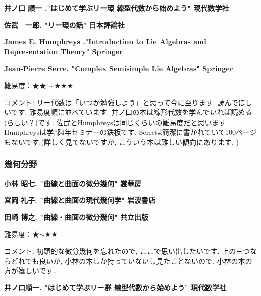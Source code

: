 \textbf{井ノ口 順一 ."はじめて学ぶリー環 線型代数から始めよう" 現代数学社} \vspace{-6pt} 

\textbf{佐武　一郎. "リー環の話" 日本評論社} \vspace{-6pt} 

\textbf{James E. Humphreys ."Introduction to Lie Algebras and Representation Theory" Springer} \vspace{-6pt} 

\textbf{Jean-Pierre Serre. "Complex Semisimple Lie Algebras" Springer}  　\vspace{-6pt} 

難易度：★★ $\sim$★★★\vspace{-6pt} 

コメント: リー代数は「いつか勉強しよう」と思って今に至ります. 読んでほしいです. 
難易度順に並べています. 井ノ口の本は線形代数を学んでいれば読める(らしい？)です. 佐武とHumphreysは同じくらいの難易度だと思います. Humphreysは学部4年セミナーの鉄板です. Serreは簡潔に書かれていて100ページもないです.(詳しく見てないですが, こういう本は難しい傾向にあります. ) 
\vspace{8pt}





\subsubsection{幾何分野}


\textbf{小林 昭七. "曲線と曲面の微分幾何" 裳華房}  　\vspace{-6pt} 

\textbf{宮岡 礼子. "曲線と曲面の現代幾何学" 岩波書店}  　\vspace{-6pt} 

\textbf{田崎 博之. "曲線・曲面の微分幾何" 共立出版}  　\vspace{-6pt} 

難易度：★$\sim$★★ 　\vspace{-6pt} 

コメント: 初頭的な微分幾何を忘れたので, ここで思い出したいです. 
上の三つならどれでも良いが, 小林の本しか持っていないし見たことないので, 小林の本の方が嬉しいです. 
\vspace{8pt}

\textbf{井ノ口順一. "はじめて学ぶリー群 線型代数から始めよう" 現代数学社}  　\vspace{-6pt} 

